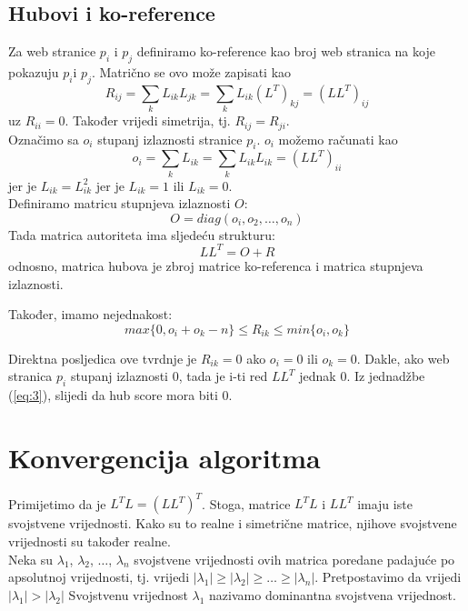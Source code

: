 \documentclass[11pt]{article}
\begin{document}
\subsection{Hubovi i ko-reference}
Za web stranice $p_i$ i $p_j$ definiramo ko-reference kao broj web stranica na koje pokazuju $p_i$i $p_j$. Matrično se ovo može zapisati kao
\begin{equation}
R_{ij} = \sum_{k} L_{ik}L_{jk} = \sum_{k}L_{ik}(L^{T})_{kj} = (LL^{T})_{ij}
\end{equation}
uz $R_{ii} = 0$. Također vrijedi simetrija, tj. $R_{ij} = R_{ji}$.\\
Označimo sa $o_{i}$ stupanj izlaznosti stranice $p_{i}$. $o_{i}$ možemo računati kao
\begin{equation}
o_{i} = \sum_{k}L_{ik} = \sum_{k}L_{ik}L_{ik} = (LL^{T})_{ii}
\end{equation}
jer je $L_{ik} = L_{ik}^2$ jer je $L_{ik} =1$ ili  $L_{ik} = 0$.\\
Definiramo matricu stupnjeva izlaznosti $O$:
\begin{equation}
O = diag(o_{i},o_{2}, \dots , o_{n})
\end{equation}
Tada matrica autoriteta ima sljedeću strukturu:
\begin{equation}
LL^{T} = O + R
\end{equation}
odnosno, matrica hubova je zbroj matrice ko-referenca i matrica stupnjeva izlaznosti.

Također, imamo nejednakost:
\begin{equation}
    max \{0, o_{i} + o_{k} - n\} \leq R_{ik} \leq min\{o_{i}, o_{k}\}
\end{equation}

Direktna posljedica ove tvrdnje je $R_{ik} = 0$ ako $o_{i} = 0$ ili $o_{k} = 0$. Dakle, ako web stranica $p_{i}$ stupanj izlaznosti 0, tada je i-ti red $LL^{T}$ jednak 0. Iz jednadžbe (\ref{eq:3}), slijedi da hub score mora biti 0.

\newpage
\section{Konvergencija algoritma}
Primijetimo da je $L^{T}L = (LL^{T})^{T}$. Stoga, matrice $L^{T}L$ i $LL^{T}$ imaju iste svojstvene vrijednosti. Kako su to realne i simetrične matrice, njihove svojstvene vrijednosti su također realne.\\
Neka su $\lambda_{1}$, $\lambda_{2}$, $\dots$, $\lambda_{n}$ svojstvene vrijednosti ovih matrica poredane padajuće po apsolutnoj vrijednosti, tj. vrijedi $|\lambda_{1}|\geq |\lambda_{2}|\geq \dots \geq |\lambda_{n}|$. Pretpostavimo da vrijedi $|\lambda_{1}| > |\lambda_{2}|$
Svojstvenu vrijednost $\lambda_{1}$ nazivamo dominantna svojstvena vrijednost.
\end{document}
